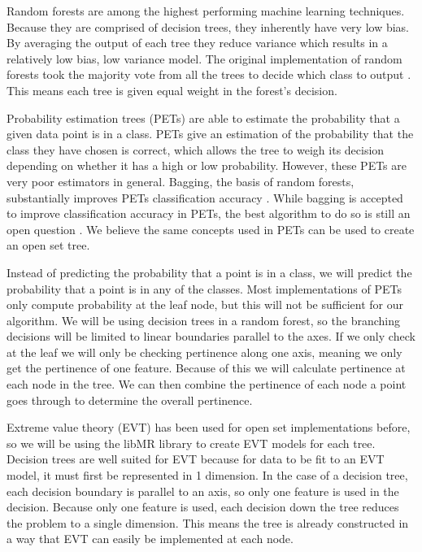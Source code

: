 \documentclass[conference]{IEEEtran}
\begin{document}
Random forests are among the highest performing machine learning techniques.  Because they are comprised of decision trees, 
they inherently have very low bias.  By averaging the output of each tree they reduce variance which 
results in a relatively low bias, low variance model.  The original implementation of random forests took
 the majority vote from all the trees to decide which class to output \cite{RF}. This means each tree is given equal weight in the forest's decision.
 
 Probability estimation trees (PETs) are able to estimate the probability that a given data point is in a class.   PETs give an estimation of the probability that the class they have chosen is correct,  which allows the tree to weigh its decision depending on whether it has a high or low probability.  However, these PETs are very poor estimators in general.  Bagging, the basis of random forests, substantially improves PETs classification accuracy \cite{baggingPETs}. While bagging is accepted to improve classification accuracy in PETs, the best algorithm to do so is still an open question \cite{RandomForestPET}.  We believe the same concepts used in PETs can be used to create an open set tree.
 
Instead of predicting the probability that a point is in a class, we will predict the probability that a point is in any of the classes. Most implementations of PETs only compute probability at the leaf node, but this will not be sufficient for our algorithm.  We will be using decision trees in a random forest, so the branching decisions will be limited to linear boundaries parallel to the axes.  If we only check at the leaf we will only be checking pertinence along one axis, meaning we only get the pertinence of one feature.  Because of this we will calculate pertinence at each node in the tree.  We can then combine the pertinence of each node a point goes through to determine the overall pertinence.

Extreme value theory (EVT) \cite{EVT} has been used for open set implementations before, so we will be using the libMR library to create EVT models for each tree.  Decision trees are well suited for EVT because for data to be fit to an EVT model, it must first be represented in 1 dimension.  In the case of a decision tree, each decision boundary is parallel to an axis, so only one feature is used in the decision.  Because only one feature is used, each decision down the tree reduces the problem to a single dimension.  This means the tree is already constructed in a way that EVT can easily be implemented at each node.
\end{document}
